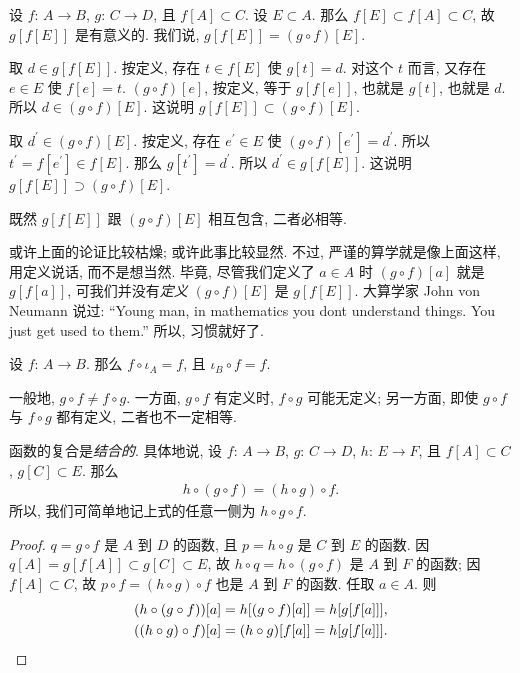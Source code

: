 \begin{remark}
    设 $f$: $A \to B$, $g$: $C \to D$, 且 $f[A] \subset C$. 设 $E \subset A$. 那么 $f[E] \subset f[A] \subset C$, 故 $g[f[E]]$ 是有意义的. 我们说, $g[f[E]] = (g \circ f)[E]$.

    取 $d \in g[f[E]]$. 按定义, 存在 $t \in f[E]$ 使 $g[t] = d$. 对这个 $t$ 而言, 又存在 $e \in E$ 使 $f[e] = t$. $(g \circ f)[e]$, 按定义, 等于 $g[f[e]]$, 也就是 $g[t]$, 也就是 $d$. 所以 $d \in (g \circ f)[E]$. 这说明 $g[f[E]] \subset (g \circ f)[E]$.

    取 $d^{\prime} \in (g \circ f)[E]$. 按定义, 存在 $e^{\prime} \in E$ 使 $(g \circ f)[e^{\prime}] = d^{\prime}$. 所以 $t^{\prime} = f[e^{\prime}] \in f[E]$. 那么 $g[t^{\prime}] = d^{\prime}$. 所以 $d^{\prime} \in g[f[E]]$. 这说明 $g[f[E]] \supset (g \circ f)[E]$.

    既然 $g[f[E]]$ 跟 $(g \circ f)[E]$ 相互包含, 二者必相等.

    或许上面的论证比较枯燥; 或许此事比较显然. 不过, 严谨的算学就是像上面这样, 用定义说话, 而不是想当然. 毕竟, 尽管我们定义了 $a \in A$ 时 $(g \circ f)[a]$ 就是 $g[f[a]]$, 可我们并没有\emph{定义} $(g \circ f)[E]$ 是 $g[f[E]]$. 大算学家 John von Neumann 说过: ``Young man, in mathematics you don{\textquotesingle}t understand things. You just get used to them.'' 所以, 习惯就好了.
\end{remark}

\begin{remark}
    设 $f$: $A \to B$. 那么 $f \circ \iota_A = f$, 且 $\iota_B \circ f = f$.
\end{remark}

\begin{remark}
    一般地, $g \circ f \neq f \circ g$. 一方面, $g \circ f$ 有定义时, $f \circ g$ 可能无定义; 另一方面, 即使 $g \circ f$ 与 $f \circ g$ 都有定义, 二者也不一定相等.
\end{remark}

\begin{theorem}
    函数的复合是\emph{结合的}. 具体地说, 设 $f$: $A \to B$, $g$: $C \to D$, $h$: $E \to F$, 且 $f[A] \subset C$, $g[C] \subset E$. 那么
    \begin{align*}
        h \circ (g \circ f) = (h \circ g) \circ f.
    \end{align*}
    所以, 我们可简单地记上式的任意一侧为 $h \circ g \circ f$.
\end{theorem}

\begin{proof}
    $q = g \circ f$ 是 $A$ 到 $D$ 的函数, 且 $p = h \circ g$ 是 $C$ 到 $E$ 的函数. 因 $q[A] = g[f[A]] \subset g[C] \subset E$, 故 $h \circ q = h \circ (g \circ f)$ 是 $A$ 到 $F$ 的函数; 因 $f[A] \subset C$, 故 $p \circ f = (h \circ g) \circ f$ 也是 $A$ 到 $F$ 的函数. 任取 $a \in A$. 则
    \begin{align*}
         & (h \circ (g \circ f))[a] = h[(g \circ f)[a]] = h[g[f[a]]],          \\
         & ((h \circ g) \circ f)[a] = (h \circ g)[f[a]] = h[g[f[a]]]. \qedhere
    \end{align*}
\end{proof}

